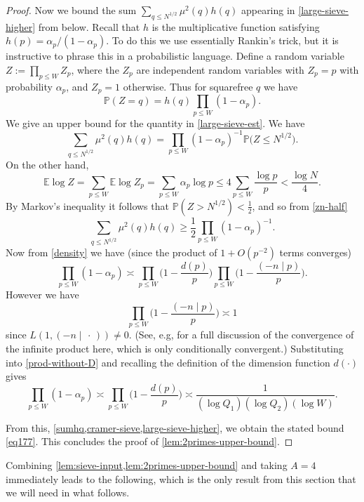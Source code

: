 \documentclass[11pt,reqno]{amsart}
\numberwithin{equation}{section}
\theoremstyle{definition}
\theoremstyle{remark}
\newcommand{\mb}{\mathbb}
\renewcommand{\le}{\leqslant}
\renewcommand{\ge}{\geqslant}
\newcommand\E{\mb{E}}
\renewcommand\P{\mb{P}}
\newcommand{\legendre}[2]{(#1 \mid #2)}
\begin{document}
\begin{proof}
Now we bound the sum $\sum_{q \le N^{1/2}}\mu^2(q) h(q)$ appearing in \cref{large-sieve-higher} from below. Recall that $h$ is the multiplicative function satisfying $h(p) = \alpha_p/(1 - \alpha_p)$. To do this we use essentially Rankin's trick, but it is instructive to phrase this in a probabilistic language. Define a random variable $Z := \prod_{p \le W} Z_p$, where the $Z_p$ are independent random variables with $Z_p = p$ with probability $\alpha_p$, and $Z_p = 1$ otherwise. Thus for squarefree $q$ we have
\[ \P(Z = q) = h(q) \prod_{p \le W} (1 - \alpha_p).\]
We give an upper bound for the quantity in \cref{large-sieve-est}. We have
\begin{equation}\label{zn-half} \sum_{q \le N^{1/2}}\mu^2(q) h(q) = \prod_{p \le W} (1 - \alpha_p)^{-1}\P \big( Z \le N^{1/2}  \big).\end{equation}
On the other hand,
\[
  \E \log Z = \sum_{p \le W} \E \log Z_p   = \sum_{p \le W} \alpha_p \log p  \le 4 \sum_{p \le W} \frac{\log p}{p} < \frac{\log N}{4}.
\]
By Markov's inequality it follows that $\P(Z > N^{1/2}) < \frac{1}{2}$, and so from \cref{zn-half}
\begin{equation}\label{sumhq} \sum_{q \le N^{1/2}}\mu^2(q) h(q) \ge \frac{1}{2} \prod_{p \le W} (1 - \alpha_p)^{-1}.\end{equation}
Now from \cref{density} we have (since the product of $1 + O(p^{-2})$ terms converges)
\begin{equation}\label{prod-without-D} \prod_{p \le W} (1 - \alpha_p) \asymp \prod_{p \le W}\bigg(1 - \frac{d(p)}{p}\bigg)  \prod_{p \le W} \bigg(1 - \frac{\legendre{-n}{p}}{p}\bigg).\end{equation} However we have
\[ \prod_{p \le W}\bigg(1 - \frac{\legendre{-n}{p}}{p}\bigg) \asymp 1 \]
since $L(1, \legendre{-n}{\, \cdot \,}) \ne 0$. (See, e.g, \cite[Theorem 4.11]{MV-book} for a full discussion of the convergence of the infinite product here, which is only conditionally convergent.) Substituting into \cref{prod-without-D} and recalling the definition of the dimension function $d(\cdot)$ gives
\[ \prod_{p \le W} (1 - \alpha_p) \asymp \prod_{p \le W}\bigg(1 - \frac{d(p)}{p}\bigg)  \asymp \frac{1}{(\log Q_1)(\log Q_2)(\log W)}. \]

From this, \cref{sumhq,cramer-sieve,large-sieve-higher}, we obtain the stated bound \cref{eq177}.
This concludes the proof of \cref{lem:2primes-upper-bound}.
\end{proof}


Combining \cref{lem:sieve-input,lem:2primes-upper-bound} and taking $A = 4$ immediately leads to the following, which is the only result from this section that we will need in what follows.
\end{document}
